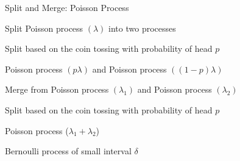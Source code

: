 \begin{frame}{Split and Merge: Poisson Process}

\plitemsep 0.1in
\bci
\item Split Poisson process $(\lambda)$ into two processes

\bci
\item<2-> Split based on the coin tossing with probability of head $p$

\item<3-> Poisson process $(p\lambda)$ and Poisson process $((1-p)\lambda)$
\eci

\item Merge from Poisson process $(\lambda_1)$ and Poisson process $(\lambda_2)$
\bci
\item<4-> Split based on the coin tossing with probability of head $p$

\item<5-> Poisson process ($\lambda_1 + \lambda_2$)

\item<6-> Bernoulli process of small interval $\delta$
\eci
\eci
\end{frame}

